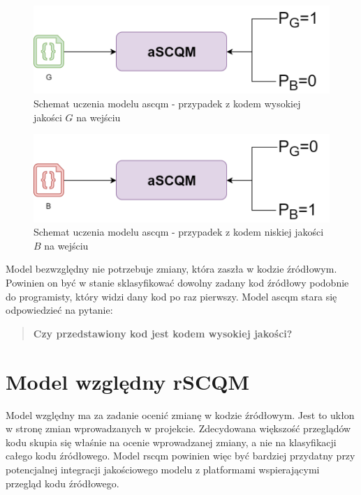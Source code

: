 \documentclass[12pt]{report}
\begin{document}
\begin{figure}
\centering
\includegraphics[width=\textwidth]{proj/ascqm-g.png}
\caption{Schemat uczenia modelu \gls{ascqm} - przypadek z kodem wysokiej jakości $G$ na wejściu}
\label{fig:proj:ascqm-g}
\end{figure}

\begin{figure}
\centering
\includegraphics[width=\textwidth]{proj/ascqm-b.png}
\caption{Schemat uczenia modelu \gls{ascqm} - przypadek z kodem niskiej jakości $B$ na wejściu}
\label{fig:proj:ascqm-b}
\end{figure}

Model bezwzględny nie potrzebuje zmiany, która zaszła w kodzie źródłowym. Powinien on być w stanie sklasyfikować dowolny zadany kod źródłowy podobnie do programisty, który widzi dany kod po raz pierwszy. Model \gls{ascqm} stara się odpowiedzieć na pytanie:

\begin{quote}
\textbf{Czy przedstawiony kod jest kodem wysokiej jakości?}
\end{quote}

\section{Model względny rSCQM}
\label{sec:proj:wz}
Model względny ma za zadanie ocenić zmianę w kodzie źródłowym. Jest to ukłon w stronę zmian wprowadzanych w projekcie. Zdecydowana większość przeglądów kodu skupia się właśnie na ocenie wprowadzanej zmiany, a nie na klasyfikacji całego kodu źródłowego. Model \gls{rscqm} powinien więc być bardziej przydatny przy potencjalnej integracji jakościowego modelu z platformami wspierającymi przegląd kodu źródłowego.
\end{document}
